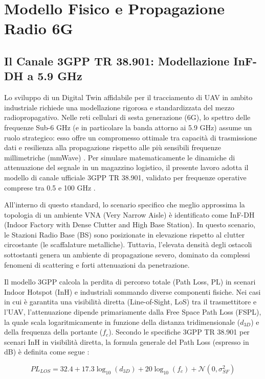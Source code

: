 \documentclass[twoside]{article}
\begin{document}
\clearpage
\section{Modello Fisico e Propagazione Radio 6G}
\subsection{Il Canale 3GPP TR 38.901: Modellazione InF-DH a 5.9 GHz}

Lo sviluppo di un Digital Twin affidabile per il tracciamento di UAV in ambito industriale richiede una modellazione rigorosa e standardizzata del mezzo radiopropagativo. Nelle reti cellulari di sesta generazione (6G), lo spettro delle frequenze Sub-6 GHz (e in particolare la banda attorno ai 5.9 GHz) assume un ruolo strategico: esso offre un compromesso ottimale tra capacità di trasmissione dati e resilienza alla propagazione rispetto alle più sensibili frequenze millimetriche (mmWave) \cite{Gebretsadik2024,Poddar2024}. Per simulare matematicamente le dinamiche di attenuazione del segnale in un magazzino logistico, il presente lavoro adotta il modello di canale ufficiale 3GPP TR 38.901, validato per frequenze operative comprese tra 0.5 e 100 GHz \cite{Poddar2024}.

All'interno di questo standard, lo scenario specifico che meglio approssima la topologia di un ambiente VNA (Very Narrow Aisle) è identificato come InF-DH (Indoor Factory with Dense Clutter and High Base Station). In questo scenario, le Stazioni Radio Base (BS) sono posizionate in elevazione rispetto al clutter circostante (le scaffalature metalliche). Tuttavia, l'elevata densità degli ostacoli sottostanti genera un ambiente di propagazione severo, dominato da complessi fenomeni di scattering e forti attenuazioni da penetrazione.

Il modello 3GPP calcola la perdita di percorso totale (Path Loss, PL) in scenari Indoor Hotspot (InH) e industriali sommando diverse componenti fisiche. Nei casi in cui è garantita una visibilità diretta (Line-of-Sight, LoS) tra il trasmettitore e l'UAV, l'attenuazione dipende primariamente dalla Free Space Path Loss (FSPL), la quale scala logaritmicamente in funzione della distanza tridimensionale ($d_{3D}$) e della frequenza della portante ($f_c$). Secondo le specifiche 3GPP TR 38.901 per scenari InH in visibilità diretta, la formula generale del Path Loss (espresso in dB) è definita come segue \cite{Poddar2024}:

\begin{equation} 
PL_{LOS} = 32.4 + 17.3 \log_{10}(d_{3D}) + 20 \log_{10}(f_c) + \mathcal{N}(0, \sigma_{SF}^2) \label{eq:pl_los} 
\end{equation} 
\end{document}
